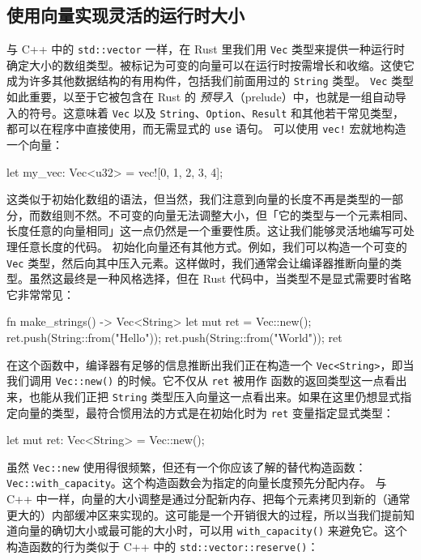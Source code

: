 \subsection{使用向量实现灵活的运行时大小}
\label{idx:idx_cdeddc9b}
与 C++ 中的 \texttt{std::vector} 一样，在 Rust 里我们用 \texttt{Vec} 类型来提供一种运行时确定大小的数组类型。被标记为可变的向量可以在运行时按需增长和收缩。这使它成为许多其他数据结构的有用构件，包括我们前面用过的 \texttt{String} 类型。
\label{idx:idx_eb78c8d0}
\texttt{Vec} 类型如此重要，以至于它被包含在 Rust 的 \emph{预导入}（prelude）中，也就是一组自动导入的符号。这意味着 \texttt{Vec} 以及 \texttt{String}、\texttt{Option}、\texttt{Result} 和其他若干常见类型，都可以在程序中直接使用，而无需显式的 \texttt{use} 语句。
可以使用 \texttt{vec!} 宏就地构造一个向量：
\begin{codebox}[rust]
let my_vec: Vec<u32> = vec![0, 1, 2, 3, 4];
\end{codebox}
这类似于初始化数组的语法，但当然，我们注意到向量的长度不再是类型的一部分，而数组则不然。不可变的向量无法调整大小，但「它的类型与一个元素相同、长度任意的向量相同」这一点仍然是一个重要性质。这让我们能够灵活地编写可处理任意长度的代码。
初始化向量还有其他方式。例如，我们可以构造一个可变的 \texttt{Vec} 类型，然后向其中压入元素。这样做时，我们通常会让编译器推断向量的类型。虽然这最终是一种风格选择，但在 Rust 代码中，当类型不是显式需要时省略它非常常见：
\begin{codebox}[rust]
fn make_strings() -> Vec<String> {
    let mut ret = Vec::new();
    ret.push(String::from("Hello"));
    ret.push(String::from("World"));
    ret
}
\end{codebox}
\label{idx:idx_f6da4a37}
在这个函数中，编译器有足够的信息推断出我们正在构造一个
\texttt{Vec<String>}，即当我们调用 \texttt{Vec::new()} 的时候。它不仅从 \texttt{ret} 被用作
函数的返回类型这一点看出来，也能从我们正把 \texttt{String} 类型压入向量这一点看出来。如果在这里仍想显式指定向量的类型，最符合惯用法的方式是在初始化时为 \texttt{ret} 变量指定显式类型：
\begin{codebox}[rust]
let mut ret: Vec<String> = Vec::new();
\end{codebox}
虽然 \texttt{Vec::new} 使用得很频繁，但还有一个你应该了解的替代构造函数：
\texttt{Vec::\allowbreak{}with\_\allowbreak{}capacity}。这个构造函数会为指定的向量长度预先分配内存。
与 C++ 中一样，向量的大小调整是通过分配新内存、把每个元素拷贝到新的（通常更大的）内部缓冲区来实现的。这可能是一个开销很大的过程，所以当我们提前知道向量的确切大小或最可能的大小时，可以用 \texttt{with\_\allowbreak{}capacity(\allowbreak{})\allowbreak{}} 来避免它。这个构造函数的行为类似于 C++ 中的 \texttt{std::\allowbreak{}vector::\allowbreak{}reserve(\allowbreak{})\allowbreak{}}：

